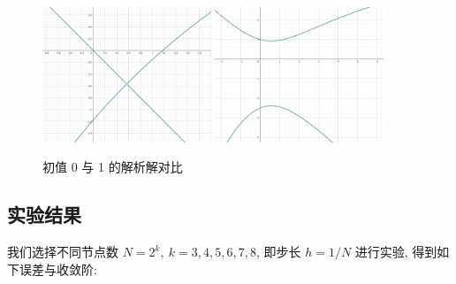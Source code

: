 \documentclass[12pt]{article}
\begin{document}
			\begin{figure}[htbp]
				\centering
				\includegraphics[width=0.45\textwidth]{figure/f_ab50.png}
				\includegraphics[width=0.45\textwidth]{figure/f_ab51.png}
				\caption{初值 0 与 1 的解析解对比}
				\label{fig:f}
			\end{figure}

		\subsection{实验结果}
			我们选择不同节点数 $N = 2^k,\ k=3,4,5,6,7,8$, 即步长 $h = 1/N$ 进行实验, 得到如下误差与收敛阶:
\end{document}
